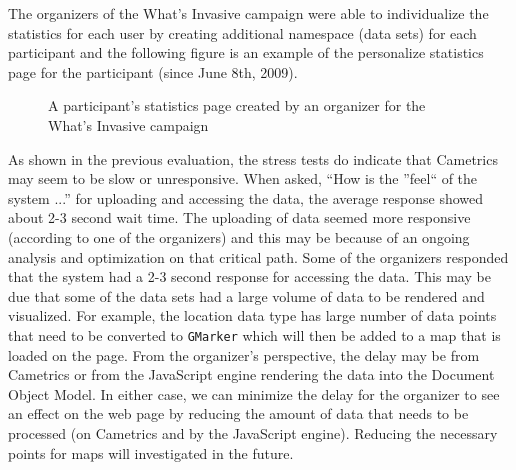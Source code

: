 \documentclass[10pt,a4paper,english]{article}
\begin{document}
The organizers of the What's Invasive campaign were able to individualize the statistics for each user by creating additional namespace (data sets) for each participant and the following figure is an example of the personalize statistics page for the participant (since June 8th, 2009).
\begin{figure}[htbp]
\centering

\caption{A participant's statistics page created by an organizer for the What's Invasive campaign}\end{figure}

As shown in the previous evaluation, the stress tests do indicate that Cametrics may seem to be slow or unresponsive. When asked, ``How is the ''feel`` of the system ...'' for uploading and accessing the data, the average response showed about 2-3 second wait time. The uploading of data seemed more responsive (according to one of the organizers) and this may be because of an ongoing analysis and optimization on that critical path. Some of the organizers responded that the system had a 2-3 second response for accessing the data. This may be due that some of the data sets had a large volume of data to be rendered and visualized. For example, the location data type has large number of data points that need to be converted to \texttt{GMarker} which will then be added to a map that is loaded on the page. From the organizer's perspective, the delay may be from Cametrics or from the JavaScript engine rendering the data into the Document Object Model. In either case, we can minimize the delay for the organizer to see an effect on the web page by reducing the amount of data that needs to be processed (on Cametrics and by the JavaScript engine). Reducing the necessary points for maps will investigated in the future.
\end{document}
